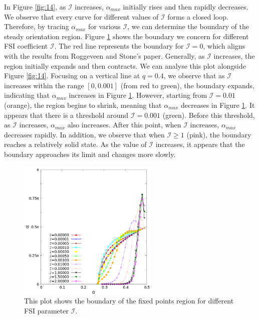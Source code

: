 \documentclass[lineno]{JFM-FLM_Au}
\begin{document}
In Figure \ref{fig:14}, as $\mathcal{I}$ increases, $\alpha_{max}$ initially rises and then rapidly decreases. We observe that every curve for different values of $\mathcal{I}$ forms a closed loop. Therefore, by tracing $\alpha_{max}$ for various $\mathcal{I}$, we can determine the boundary of the steady orientation region. Figure \ref{fig:15} shows the boundary we concern for different FSI coefficient $\mathcal{I}$. The red line represents the boundary for $\mathcal{I}=0$, which aligns with the results from Roggeveen and Stone's paper. Generally, as $\mathcal{I}$ increases, the region initially expands and then contracts. We can analyse this plot alongside Figure \ref{fig:14}. Focusing on a vertical line at $q = 0.4$, we observe that as $\mathcal{I}$ increases within the range $[0, 0.001]$ (from red to green), the boundary expands, indicating that $\alpha_{max}$ increases in Figure \ref{fig:15}. However, starting from  $\mathcal{I} = 0.01$ (orange), the region begins to shrink, meaning that $\alpha_{max}$ decreases in Figure \ref{fig:15}. It appears that there is a threshold around $\mathcal{I}=0.001$ (green). Before this threshold, as $\mathcal{I}$ increases, $\alpha_{max}$ also increases. After this point, when $\mathcal{I}$ increases, $\alpha_{max}$ decreases rapidly. In addition, we observe that when $\mathcal{I}\geq1$ (pink), the boundary reaches a relatively solid state. As the value of $\mathcal{I}$ increases, it appears that the boundary approaches its limit and changes more slowly.
\begin{figure}[!h]
	\begin{center}
		\includegraphics[width=0.6\textwidth]{plot/RESLT_q_alpha_plot/elastic_beam_general.png}
		\caption{This plot shows the boundary of the fixed points region for different FSI parameter $\mathcal{I}$.}
		\label{fig:15}
	\end{center}
\end{figure}
\end{document}
